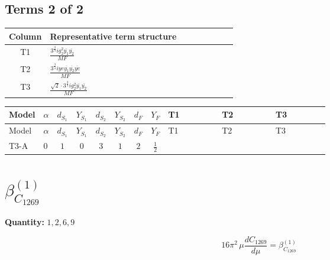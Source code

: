 \documentclass[8pt]{article}
\begin{document}
\begin{landscape}
\subsection*{Terms 2 of 2}
\begin{center}
\begin{tabular}{@{}c >{\raggedright\arraybackslash}p{0.82\linewidth}@{}}
\toprule
Column & Representative term structure \\
\midrule
T1 & \(\displaystyle \frac{3^{\frac{3}{4}} i g_{2}^{2} \overline{y_{1}} \overline{y_{2}}}{MF}\) \\
\midrule
T2 & \(\displaystyle \frac{3^{\frac{3}{4}} i ye \overline{y_{1}} \overline{y_{2}} \overline{ye}}{MF}\) \\
\midrule
T3 & \(\displaystyle \frac{\sqrt{2} \cdot 3^{\frac{3}{4}} i g_{2}^{2} \overline{y_{1}} \overline{y_{2}}}{MF}\) \\
\midrule
\bottomrule
\end{tabular}
\end{center}
\smallskip
\tiny
\begin{longtable}{@{}llcccccc >{\raggedright\arraybackslash}p{0.21\linewidth} >{\raggedright\arraybackslash}p{0.21\linewidth} >{\raggedright\arraybackslash}p{0.21\linewidth}@{}}
\toprule
Model & $\alpha$ & $d_{S_1}$ & $Y_{S_1}$ & $d_{S_2}$ & $Y_{S_2}$ & $d_F$ & $Y_F$ & T1 & T2 & T3 \\
\midrule
\endfirsthead
\toprule
Model & $\alpha$ & $d_{S_1}$ & $Y_{S_1}$ & $d_{S_2}$ & $Y_{S_2}$ & $d_F$ & $Y_F$ & T1 & T2 & T3 \\
\midrule
\endhead
T3-A & $0$ & $1$ & $0$ & $3$ & $1$ & $2$ & $\frac{1}{2}$ & \scriptsize\adjustbox{max width=\linewidth}{$\begin{gathered} \frac{25 \cdot 3^{\frac{3}{4}} i g_{2}^{2} \overline{y_{1}} \overline{y_{2}}}{24 MF}\end{gathered}$} & \scriptsize\adjustbox{max width=\linewidth}{$\begin{gathered} - \frac{3^{\frac{3}{4}} i ye \overline{y_{1}} \overline{y_{2}} \overline{ye}}{12 MF}\end{gathered}$} & \scriptsize\adjustbox{max width=\linewidth}{$\begin{gathered} \frac{\sqrt{2} \cdot 3^{\frac{3}{4}} i g_{2}^{2} \overline{y_{1}} \overline{y_{2}}}{6 MF}\end{gathered}$} \\
\midrule
\bottomrule
\end{longtable}
\clearpage
\section*{$\beta_{C_{1269}}^{(1)}$}
\noindent\textbf{Quantity: }$\mathrm{1,2,6,9}$\par\smallskip
\[16\pi^2\,\mu\frac{d C_{1269}}{d\mu}=\beta_{C_{1269}}^{(1)}\]

\end{landscape}
\end{document}
